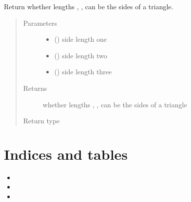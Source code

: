 \documentclass[letterpaper,10pt,english]{sphinxmanual}
\begin{document}
\begin{fulllineitems}
\label{\detokenize{api:trianglelib.utils.is_triangle}}
Return whether lengths , ,  can be the sides of a triangle.
\begin{quote}\begin{description}
\item[{Parameters}] \leavevmode\begin{itemize}
\item {} 
 () \textendash{} side length one

\item {} 
 () \textendash{} side length two

\item {} 
 () \textendash{} side length three

\end{itemize}

\item[{Returns}] \leavevmode
whether lengths , ,  can be the sides of a triangle

\item[{Return type}] \leavevmode
{}

\end{description}\end{quote}

\end{fulllineitems}



\chapter{Indices and tables}
\label{\detokenize{index:indices-and-tables}}\begin{itemize}
\item {} 

\item {} 

\item {} 

\end{itemize}
\end{document}
